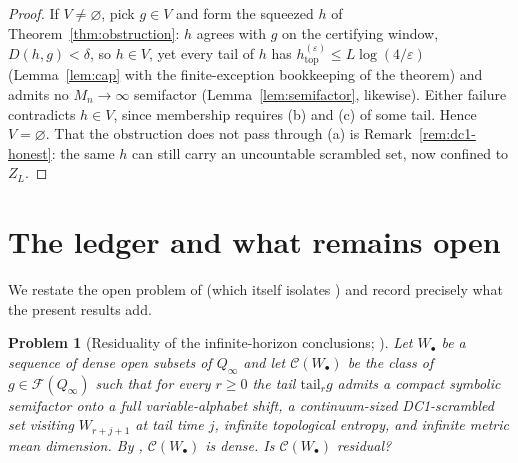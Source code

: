 \documentclass[11pt]{article}
\newtheorem{problem}[theorem]{Problem}
\newcommand{\Q}{Q_\infty}
\newcommand{\F}{\mathcal{F}}
\begin{document}
\begin{proof}
If $V\ne\varnothing$, pick $g\in V$ and form the squeezed $h$ of
Theorem~\ref{thm:obstruction}: $h$ agrees with $g$ on the certifying window,
$D(h,g)<\delta$, so $h\in V$, yet every tail of $h$ has
$h^{(\varepsilon)}_{\mathrm{top}}\le L\log(4/\varepsilon)$ (Lemma~\ref{lem:cap} with the
finite-exception bookkeeping of the theorem) and admits no $M_n\to\infty$ semifactor
(Lemma~\ref{lem:semifactor}, likewise).  Either failure contradicts $h\in V$, since
membership requires (b) and (c) of some tail.  Hence $V=\varnothing$.  That the
obstruction does not pass through (a) is Remark~\ref{rem:dc1-honest}: the same $h$ can
still carry an uncountable scrambled set, now confined to $Z_L$.
\end{proof}

\section{The ledger and what remains open}\label{sec:open}

We restate the open problem of \cite{companion} (which itself isolates
\cite[\S14]{Shmalo2026}) and record precisely what the present results add.

\begin{problem}[{Residuality of the infinite-horizon conclusions; \cite[Problem~8.1]{companion}}]\label{prob:companion}
Let $W_\bullet$ be a sequence of dense open subsets of $\Q$ and let
$\mathcal C(W_\bullet)$ be the class of $g\in\F(\Q)$ such that for every $r\ge0$ the tail
$\mathrm{tail}_rg$ admits a compact symbolic semifactor onto a full variable-alphabet
shift, a continuum-sized DC1-scrambled set visiting $W_{r+j+1}$ at tail time $j$,
infinite topological entropy, and infinite metric mean dimension.  By
\cite[Theorem~3.6]{Shmalo2026}, $\mathcal C(W_\bullet)$ is dense.  Is
$\mathcal C(W_\bullet)$ residual?
\end{problem}
\end{document}
